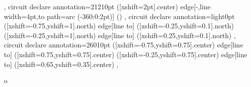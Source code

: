 {{  },
 circuit declare annotation={2121}{0pt} %
  {
   ([xshift=2pt]\tikzlastnode.center) edge[-,line width=4pt,to path={arc (-360:0:2pt)}] ()
  },
 circuit declare annotation={light}{0pt} %
  {
   ([xshift=-0.75\tikzcircuitssizeunit,yshift=1\tikzcircuitssizeunit]\tikzlastnode.north) edge[line to] ([xshift=-0.25\tikzcircuitssizeunit,yshift=0.1\tikzcircuitssizeunit]\tikzlastnode.north)
   ([xshift=-0.25\tikzcircuitssizeunit,yshift=1\tikzcircuitssizeunit]\tikzlastnode.north) edge[line to] ([xshift=0.25\tikzcircuitssizeunit,yshift=0.1\tikzcircuitssizeunit]\tikzlastnode.north)
  },
 circuit declare annotation={2601}{0pt} %
  {
   ([xshift=-0.75\tikzcircuitssizeunit,yshift=0.75\tikzcircuitssizeunit]\tikzlastnode.center) edge[line to] ([xshift=0.75\tikzcircuitssizeunit,yshift=0.75\tikzcircuitssizeunit]\tikzlastnode.center)
   ([xshift=-0.25\tikzcircuitssizeunit,yshift=0.75\tikzcircuitssizeunit]\tikzlastnode.center) edge[line to] ([xshift=0.65\tikzcircuitssizeunit,yshift=0.35\tikzcircuitssizeunit]\tikzlastnode.center)
  },
}

\makeatletter
\newcommand\currentcoordinate{\the\tikz@lastxsaved,\the\tikz@lastysaved}

\newcommand{\crossings}[2]{
 \fill [name intersections={of=#1 and #2, name=i, total=\t}]
 \foreach \s in {1,...,\t}{(i-\s) node[crossing] {}};
}


 { o }
{
 \begin{scope}[\fscolor, line width=\fslinewidth, \fslinetype]
  }
  {
 \end{scope}
}
\makeatother

\endinput
